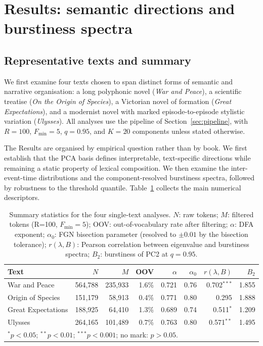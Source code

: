 \documentclass[12pt,a4paper]{article}
\begin{document}
\section{Results: semantic directions and burstiness spectra}
\label{sec:oliver}

\subsection{Representative texts and summary}
\label{sec:representative_summary}

We first examine four texts chosen to span distinct forms of semantic
and narrative organisation: a long polyphonic novel (\emph{War and
Peace}), a scientific treatise (\emph{On the Origin of Species}), a
Victorian novel of formation (\emph{Great Expectations}), and a
modernist novel with marked episode-to-episode stylistic variation
(\emph{Ulysses}). All analyses use the pipeline of
Section~\ref{sec:pipeline}, with $R=100$, $F_{\min}=5$, $q=0.95$, and
$K=20$ components unless stated otherwise.

The Results are organised by empirical question rather than by book.
We first establish that the PCA basis defines interpretable,
text-specific directions while remaining a static property of lexical
composition. We then examine the inter-event-time distributions and the
component-resolved burstiness spectra, followed by robustness to the
threshold quantile. Table~\ref{tab:single_text_summary} collects the
main numerical descriptors.

\begin{table}[htbp]
\centering
\caption{Summary statistics for the four single-text analyses.
$N$: raw tokens; $M$: filtered tokens (R=100, $F_{\min}=5$);
OOV: out-of-vocabulary rate after filtering;
$\alpha$: DFA exponent; $\alpha_0$: FGN bisection parameter
(resolved to $\pm0.01$ by the bisection tolerance);
$r(\lambda, B)$: Pearson correlation between eigenvalue and
burstiness spectra; $B_2$: burstiness of PC2 at $q=0.95$.}
\label{tab:single_text_summary}
\small
\begin{tabular}{lrrrrrrr}
\toprule
Text & $N$ & $M$ & OOV & $\alpha$ & $\alpha_0$ &
      $r(\lambda,B)$ & $B_2$ \\
\midrule
War and Peace     & 564{,}788 & 235{,}933 & 1.6\% &
  0.721 & 0.76 & 0.702$^{***}$ & 1.855 \\
Origin of Species & 151{,}179 &  58{,}913 & 0.4\% &
  0.771 & 0.80 & 0.295          & 1.888 \\
Great Expectations & 188{,}925 & 64{,}410 & 1.3\% &
  0.689 & 0.74 & 0.511$^{*}$   & 1.209 \\
Ulysses           & 264{,}165 & 101{,}489 & 0.7\% &
  0.763 & 0.80 & 0.571$^{**}$  & 1.495 \\
\bottomrule
\multicolumn{8}{l}{\small $^*p<0.05$;\; $^{**}p<0.01$;\;
  $^{***}p<0.001$;\; no mark: $p>0.05$.}
\end{tabular}
\end{table}
\end{document}
